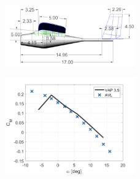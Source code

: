 \begin{figure}[H]
    \centering
    \includegraphics[width=0.5\textwidth]{05_Results/Figs/VAP/genMAV/dimensions.png}
    \label{fig:genMAVDimensions}
\end{figure}

\begin{figure}[H]
         \centering
         \includegraphics[width=0.5\textwidth]{05_Results/Figs/VAP/genMAV/GenMAVModelValidation1.png}
         \label{fig:genMAV_Cm}
         \caption{}
\end{figure}

       

       




